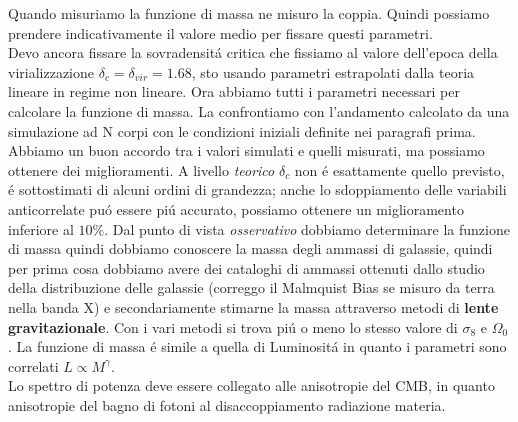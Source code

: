 \documentclass[12pt, a4paper]{article}
\begin{document}
Quando misuriamo la funzione di massa ne misuro la coppia. Quindi possiamo prendere indicativamente il valore medio per fissare questi parametri.\\
Devo ancora fissare la sovradensit\'{a} critica che fissiamo al valore dell'epoca della virializzazione $\delta_c=\delta_{vir}=1.68$, sto usando parametri estrapolati dalla teoria lineare in regime non lineare. Ora abbiamo tutti i parametri necessari per calcolare la funzione di massa. La confrontiamo con l'andamento calcolato da una simulazione ad N corpi con le condizioni iniziali definite nei paragrafi prima. Abbiamo un buon accordo tra i valori simulati e quelli misurati, ma possiamo ottenere dei miglioramenti. A livello \textit{teorico } $\delta_c$ non \'{e} esattamente quello previsto, \'{e} sottostimati di alcuni ordini di grandezza; anche lo sdoppiamento delle variabili anticorrelate pu\'{o} essere pi\'{u} accurato, possiamo ottenere un miglioramento inferiore al $10\%$. Dal punto di vista \textit{osservativo} dobbiamo determinare la funzione di massa quindi dobbiamo conoscere la massa degli ammassi di galassie, quindi per prima cosa dobbiamo avere dei cataloghi di ammassi ottenuti dallo studio della distribuzione delle galassie (correggo il Malmquist Bias se misuro da terra nella banda X) e secondariamente stimarne la massa attraverso metodi di \textbf{lente gravitazionale}. Con i vari metodi si trova pi\'{u} o meno lo stesso valore di $\sigma_8$ e $\Omega_0$. La funzione di massa \'{e} simile a quella di Luminosit\'{a} in quanto i parametri sono correlati $L\propto M^{\gamma}$.\\
Lo spettro di potenza deve essere collegato alle anisotropie del CMB, in quanto anisotropie del bagno di fotoni al disaccoppiamento radiazione materia.
\end{document}

